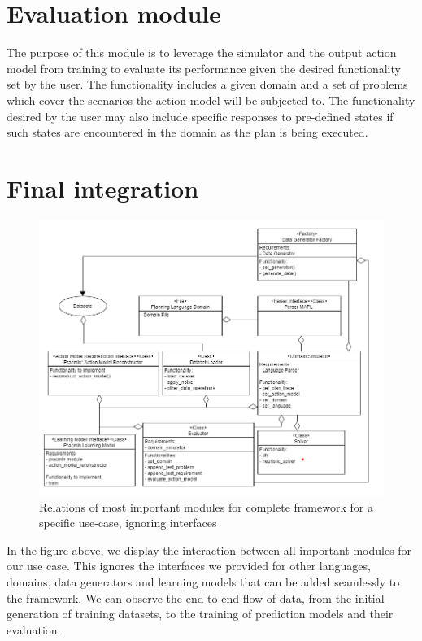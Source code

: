 \newpage
\section{Evaluation module}
The purpose of this module is to leverage the simulator and the output action model from training to evaluate its performance given the desired functionality set by the user.
The functionality includes a given domain and a set of problems which cover the scenarios the action model will be subjected to.
The functionality desired by the user may also include specific responses to pre-defined states if such states are encountered in the domain as the plan is being executed.

\newpage
\section{Final integration}
\begin{figure}[h]
 \centering
 \includegraphics[width=1\textwidth]{images/architecture/final_integration_uml}
 \caption{Relations of most important modules for complete framework for a specific use-case, ignoring interfaces}
  \label{fig:learning-module-interaction-uml}
\end{figure}
In the figure above, we display the interaction between all important modules for our use case. This ignores the interfaces we provided for other languages, domains, data generators and learning models that can be added seamlessly to the framework. We can observe the end to end flow of data, from the initial generation of training datasets, to the training of prediction models and their evaluation.


